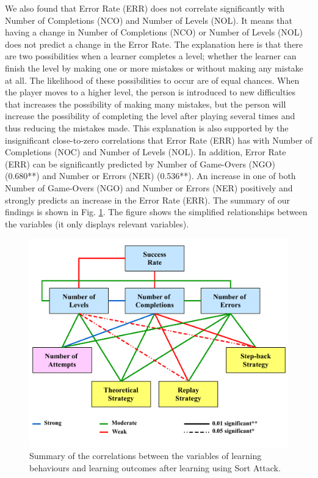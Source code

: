 \documentclass[conference]{IEEEtran}
\begin{document}
We also found that Error Rate (ERR) does not correlate significantly with Number of Completions (NCO) and Number of Levels (NOL). It means that having a change in Number of Completions (NCO) or Number of Levels (NOL) does not predict a change in the Error Rate. The explanation here is that there are two possibilities when a learner completes a level; whether the learner can finish the level by making one or more mistakes or without making any mistake at all. The likelihood of these possibilities to occur are of equal chances. When the player moves to a higher level, the person is introduced to new difficulties that increases the possibility of making many mistakes, but the person will increase the possibility of completing the level after playing several times and thus reducing the mistakes made. This explanation is also supported by the insignificant close-to-zero correlations that Error Rate (ERR) has with Number of Completions (NOC) and Number of Levels (NOL). In addition, Error Rate (ERR) can be significantly predicted by Number of Game-Overs (NGO) (0.680**) and Number or Errors (NER) (0.536**). An increase in one of both Number of Game-Overs (NGO) and Number or Errors (NER) positively and strongly predicts an increase in the Error Rate (ERR).  The summary of our findings is shown in  Fig. \ref{fig:conclusion}. The figure shows the simplified relationships between the variables (it only displays relevant variables).

\begin{figure}
  \centering
  \includegraphics[width=\linewidth]{conclusion}
  \caption{Summary of the correlations between the variables of learning behaviours and learning outcomes after learning using Sort Attack.}
  \label{fig:conclusion}
\end{figure}
\end{document}
